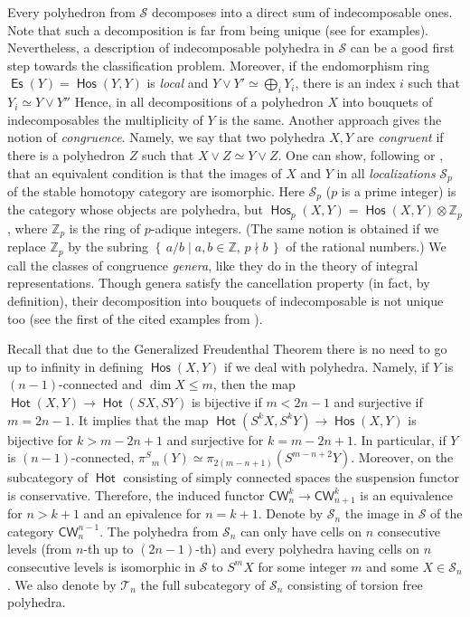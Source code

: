 \documentclass[12pt,a4paper]{amsart}
\theoremstyle{definition}
\theoremstyle{remark}
\numberwithin{equation}{section}
\begin{document}
 Every polyhedron from ${\mathscr S}$ decomposes into a direct sum of indecomposable ones. Note that
 such a decomposition is far from being unique (see \cite[4.2]{co} for examples). Nevertheless, a
 description of indecomposable polyhedra in ${\mathscr S}$ can be a good first step towards the
 classification problem. Moreover, if the endomorphism ring ${\mathop\mathsf{Es}\nolimits}(Y)={\mathop\mathsf{Hos}\nolimits}(Y,Y)$ is \emph{local}
 and $Y\vee Y'\simeq{\bigoplus}_iY_i$, there is an index $i$ such that $Y_i\simeq Y\vee Y''$
 \cite[Lemma~I.3.5]{bas} 
 Hence, in all decompositions of a polyhedron $X$ into bouquets of indecomposables the multiplicity
 of $Y$ is the same. Another approach gives the notion of
 \emph{congruence}. Namely, we say that two polyhedra $X,Y$ are
 \emph{congruent} if there is a polyhedron $Z$ such that $X\vee
 Z\simeq Y\vee Z$. One can show, following \cite{jac} or \cite{gen},
 that an equivalent condition is that 
 the images of $X$ and $Y$ in all \emph{localizations} ${\mathscr S}_p$ of the
 stable homotopy category are isomorphic. Here ${\mathscr S}_p$ ($p$ is a
 prime integer) is the category whose objects are polyhedra, but
 ${\mathop\mathsf{Hos}\nolimits}_p(X,Y)={\mathop\mathsf{Hos}\nolimits}(X,Y){\otimes}{\mathbb Z}_p$, where ${\mathbb Z}_p$ is the ring of
 $p$-adique integers. (The same notion is obtained if we replace
 ${\mathbb Z}_p$ by the subring ${\left\{\,{a/b}\mid {a,b\in{\mathbb Z},\,p\nmid b}\,\right\}}$ of the
 rational numbers.) We call the classes of congruence \emph{genera},
 like they do in the theory of integral representations. Though genera
 satisfy the cancellation property (in fact, by definition), their
 decomposition into bouquets of indecomposable is not unique too (see
 the first of the cited examples from \cite{co}).

 Recall that due to the Generalized Freudenthal Theorem \cite[Theorem~1.21]{co} there is no need to
 go up to infinity in defining ${\mathop\mathsf{Hos}\nolimits}(X,Y)$ if we deal with polyhedra. Namely, if $Y$  is $(n-1)$-connected
 and $\dim X\le m$, then the map ${\mathop\mathsf{Hot}\nolimits}(X,Y)\to{\mathop\mathsf{Hot}\nolimits}(SX,SY)$ is bijective if $m<2n-1$ and
 surjective if $m=2n-1$. It implies that the map ${\mathop\mathsf{Hot}\nolimits}(S^kX,S^kY)\to{\mathop\mathsf{Hos}\nolimits}(X,Y)$ is bijective for
 $k>m-2n+1$ and surjective for $k=m-2n+1$. In particular, if $Y$ is $(n-1)$-connected,
 ${\pi^S}_m(Y)\simeq\pi_{2(m-n+1)}(S^{m-n+2}Y)$.
 Moreover, on the subcategory of ${\mathop\mathsf{Hot}\nolimits}$ consisting of simply connected
 spaces the suspension functor is conservative. Therefore, the induced functor ${\mathsf{CW}}^k_n\to{\mathsf{CW}}^k_{n+1}$
 is an equivalence for $n>k+1$ and an epivalence for $n=k+1$. Denote by ${\mathscr S}_n$ the image in
 ${\mathscr S}$ of the category ${\mathsf{CW}}^{n-1}_n$. The polyhedra from ${\mathscr S}_n$ can only have cells on
 $n$ consecutive levels (from $n$-th up to $(2n-1)$-th) and every polyhedra having cells on $n$
 consecutive levels is isomorphic in ${\mathscr S}$ to $S^mX$ for some integer $m$ and some $X\in{\mathscr S}_n$.
 We also denote by ${\mathscr T}_n$ the full subcategory of ${\mathscr S}_n$ consisting of torsion free polyhedra.
 
\end{document}
